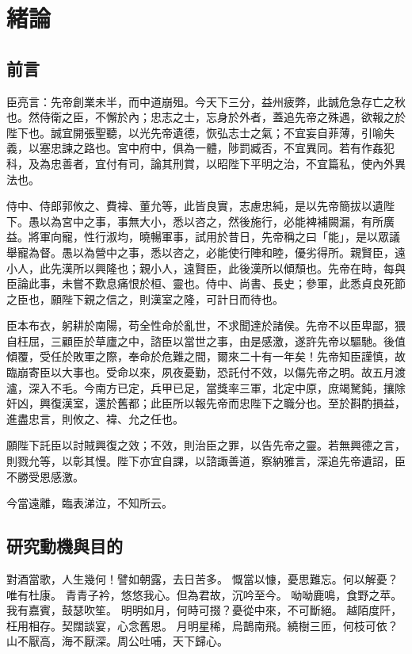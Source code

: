 
\chapter{緒論}

\section{前言}

臣亮言：先帝創業未半，而中道崩殂。今天下三分，益州疲弊，此誠危急存亡之秋也。然侍衛之臣，不懈於內；忠志之士，忘身於外者，蓋追先帝之殊遇，欲報之於陛下也。誠宜開張聖聽，以光先帝遺德，恢弘志士之氣；不宜妄自菲薄，引喻失義，以塞忠諫之路也。宮中府中，俱為一體，陟罰臧否，不宜異同。若有作姦犯科，及為忠善者，宜付有司，論其刑賞，以昭陛下平明之治，不宜篇私，使內外異法也。\par

侍中、侍郎郭攸之、費褘、董允等，此皆良實，志慮忠純，是以先帝簡拔以遺陛下。愚以為宮中之事，事無大小，悉以咨之，然後施行，必能裨補闕漏，有所廣益。將軍向寵，性行淑均，曉暢軍事，試用於昔日，先帝稱之曰「能」，是以眾議舉寵為督。愚以為營中之事，悉以咨之，必能使行陣和睦，優劣得所。親賢臣，遠小人，此先漢所以興隆也；親小人，遠賢臣，此後漢所以傾頹也。先帝在時，每與臣論此事，未嘗不歎息痛恨於桓、靈也。侍中、尚書、長史；參軍，此悉貞良死節之臣也，願陛下親之信之，則漢室之隆，可計日而待也。

臣本布衣，躬耕於南陽，苟全性命於亂世，不求聞達於諸侯。先帝不以臣卑鄙，猥自枉屈，三顧臣於草廬之中，諮臣以當世之事，由是感激，遂許先帝以驅馳。後值傾覆，受任於敗軍之際，奉命於危難之間，爾來二十有一年矣！先帝知臣謹慎，故臨崩寄臣以大事也。受命以來，夙夜憂勤，恐託付不效，以傷先帝之明。故五月渡瀘，深入不毛。今南方已定，兵甲已足，當獎率三軍，北定中原，庶竭駑鈍，攘除奸凶，興復漢室，還於舊都；此臣所以報先帝而忠陛下之職分也。至於斟酌損益，進盡忠言，則攸之、褘、允之任也。

願陛下託臣以討賊興復之效；不效，則治臣之罪，以告先帝之靈。若無興德之言，則戮允等，以彰其慢。陛下亦宜自課，以諮諏善道，察納雅言，深追先帝遺詔，臣不勝受恩感激。

今當遠離，臨表涕泣，不知所云。

\section{研究動機與目的}

對酒當歌，人生幾何！譬如朝露，去日苦多。
慨當以慷，憂思難忘。何以解憂？唯有杜康。
青青子衿，悠悠我心。但為君故，沉吟至今。
呦呦鹿鳴，食野之苹。我有嘉賓，鼓瑟吹笙。
明明如月，何時可掇？憂從中來，不可斷絕。
越陌度阡，枉用相存。契闊談宴，心念舊恩。
月明星稀，烏鵲南飛。繞樹三匝，何枝可依？
山不厭高，海不厭深。周公吐哺，天下歸心。

